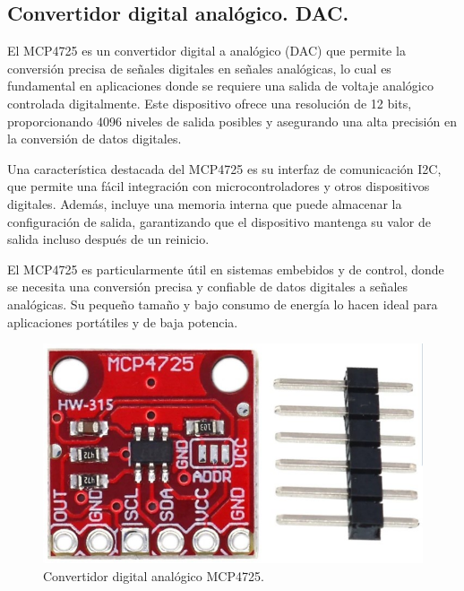 \subsection{Convertidor digital analógico. DAC.}
El MCP4725 es un convertidor digital a analógico (DAC) que permite la conversión precisa de señales digitales en señales analógicas, lo cual es fundamental en aplicaciones donde se requiere una salida de voltaje analógico controlada digitalmente. Este dispositivo ofrece una resolución de 12 bits, proporcionando 4096 niveles de salida posibles y asegurando una alta precisión en la conversión de datos digitales.\par 
Una característica destacada del MCP4725 es su interfaz de comunicación I2C, que permite una fácil integración con microcontroladores y otros dispositivos digitales. Además, incluye una memoria  interna que puede almacenar la configuración de salida, garantizando que el dispositivo mantenga su valor de salida incluso después de un reinicio.\par 
El MCP4725 es particularmente útil en sistemas embebidos y de control, donde se necesita una conversión precisa y confiable de datos digitales a señales analógicas. Su pequeño tamaño y bajo consumo de energía lo hacen ideal para aplicaciones portátiles y de baja potencia.\par 

\begin{figure}[H]
    \centering
    \includegraphics[scale=0.3]{./imagenes/mcp4725.jpg}
    \caption{Convertidor digital analógico MCP4725.}
    \label{F:DAC}
\end{figure}\par 

